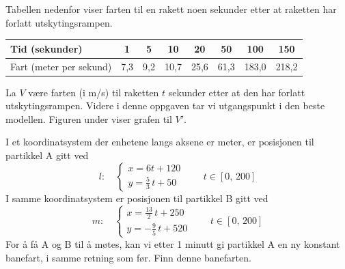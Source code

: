 \newpage
{}
Tabellen nedenfor viser farten til en rakett noen sekunder etter at raketten har forlatt
utskytingsrampen.
\begin{center}
	\small
	\begin{tabular}{|l|c|c|c|c|c|c|c|}
		\hline
		Tid (sekunder) & 1 & 5 & 10 & 20 & 50 & 100 & 150 \\ \hline
		Fart (meter per sekund) & 7,3 & 9,2 & 10,7 & 25,6 & 61,3 & 183,0 & 218,2 \\ \hline
	\end{tabular}
\end{center}
La $V$ være farten (i m/s) til raketten $t$ sekunder etter at den har forlatt utskytingsrampen.
Videre i denne oppgaven tar vi utgangspunkt i den beste modellen.
Figuren under viser grafen til $V'$.

I et koordinatsystem der enhetene langs aksene er meter, er posisjonen til partikkel A gitt ved
\[
l:\quad
\begin{cases}
	x = 6t + 120 \\[4pt]
	y = \frac{5}{3}\,t + 50
\end{cases}
\qquad t \in [0,\, 200]
\]
I samme koordinatsystem er posisjonen til partikkel B gitt ved
\[
m:\quad
\begin{cases}
	x = \frac{13}{2}\,t + 250 \\[4pt]
	y = -\frac{9}{5}\,t + 520
\end{cases}
\qquad t \in [0,\, 200]
\]
For å få A og B til å møtes, kan vi etter 1 minutt gi partikkel A en ny konstant banefart, i samme retning som før. Finn denne banefarten.

